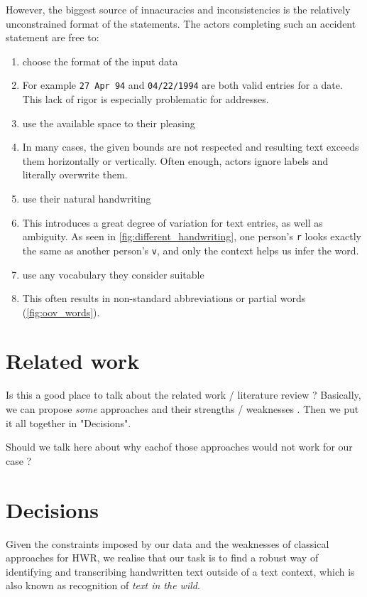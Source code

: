 However, the biggest source of innacuracies and inconsistencies is the relatively unconstrained format of the statements. The actors completing such an accident statement are free to:
\begin{enumerate}
	\item choose the format of the input data
	\item[] For example \texttt{27 Apr 94} and \texttt{04/22/1994} are both valid entries for a date. This lack of rigor is especially problematic for addresses.

	\item use the available space to their pleasing
	\item[] In many cases, the given bounds are not respected and resulting text exceeds them horizontally or vertically. Often enough, actors ignore labels and literally overwrite them.

	\item{use their natural handwriting \label{itm:natural_handwriting}}
	\item[] This introduces a great degree of variation for text entries, as well as ambiguity. As seen in \autoref{fig:different_handwriting}, one person's \texttt{r} looks exactly the same as another person's \texttt{v}, and only the context helps us infer the word.

	\item use any vocabulary they consider suitable
	\item[] This often results in non-standard abbreviations or partial words (\autoref{fig:oov_words}).
\end{enumerate}

\section{Related work}
Is this a good place to talk about the related work / literature review ? Basically, we can propose \emph{some} approaches and their strengths / weaknesses . Then we put it all together in "Decisions".

Should we talk here about why eachof those approaches would not work for our case ?

\section{Decisions}

Given the constraints imposed by our data and the weaknesses of classical approaches for HWR, we realise that our task is to find a robust way of identifying and transcribing handwritten text outside of a text context, which is also known as recognition of \emph{text in the wild}.





